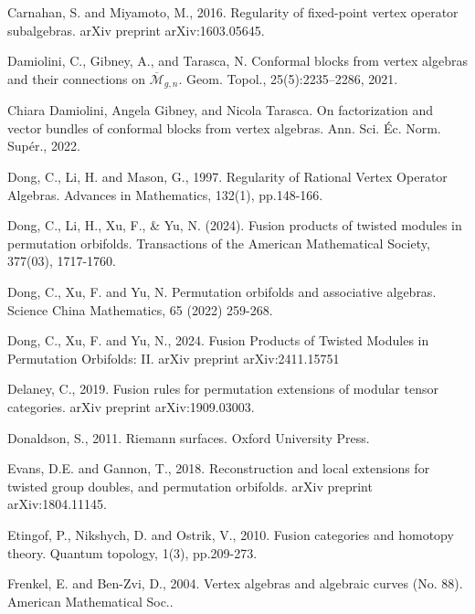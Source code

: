\documentclass[11pt,b5paper,notitlepage]{article}
\theoremstyle{definition}
\theoremstyle{plain}
\newcommand{\mc}{\mathcal}
\newcommand{\ovl}{\overline}
\numberwithin{equation}{subsection}
\begin{document}
\begin{thebibliography}{999999}
Carnahan, S. and Miyamoto, M., 2016. Regularity of fixed-point vertex operator subalgebras. arXiv preprint arXiv:1603.05645.


Damiolini, C., Gibney, A., and Tarasca, N. Conformal blocks from vertex algebras and their connections on $\ovl{\mc M}_{g,n}$.  Geom. Topol., 25(5):2235–2286, 2021.

Chiara Damiolini, Angela Gibney, and Nicola Tarasca. On factorization and vector bundles of conformal blocks from vertex algebras. Ann. Sci. \'Ec. Norm. Sup\'er., 2022.




		
Dong, C., Li, H. and Mason, G., 1997. Regularity of Rational Vertex Operator Algebras. Advances in Mathematics, 132(1), pp.148-166.	





Dong, C., Li, H., Xu, F., \& Yu, N. (2024). Fusion products of twisted modules in permutation orbifolds. Transactions of the American Mathematical Society, 377(03), 1717-1760.

Dong, C., Xu, F. and Yu, N. Permutation orbifolds and associative algebras. Science China Mathematics, 65 (2022) 259-268.


Dong, C., Xu, F. and Yu, N., 2024. Fusion Products of Twisted Modules in Permutation Orbifolds: II. arXiv preprint arXiv:2411.15751


Delaney, C., 2019. Fusion rules for permutation extensions of modular tensor categories. arXiv preprint arXiv:1909.03003.


Donaldson, S., 2011. Riemann surfaces. Oxford University Press.

Evans, D.E. and Gannon, T., 2018. Reconstruction and local extensions for twisted group doubles, and permutation orbifolds. arXiv preprint arXiv:1804.11145.


Etingof, P., Nikshych, D. and Ostrik, V., 2010. Fusion categories and homotopy theory. Quantum topology, 1(3), pp.209-273.


Frenkel, E. and Ben-Zvi, D., 2004. Vertex algebras and algebraic curves (No. 88). American Mathematical Soc..



\end{thebibliography}
\end{document}
